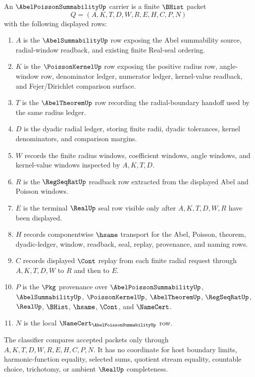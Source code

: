 \begin{definition}
\label{def:abel-poisson-summability-carrier}
An $\AbelPoissonSummabilityUp$ carrier is a finite $\BHist$ packet
$$
Q=(A,K,T,D,W,R,E,H,C,P,N)
$$
with the following displayed rows:
\begin{enumerate}
\item $A$ is the $\AbelSummabilityUp$ row exposing the Abel summability source, radial-window readback, and existing finite Real-seal ordering.
\item $K$ is the $\PoissonKernelUp$ row exposing the positive radius row, angle-window row, denominator ledger, numerator ledger, kernel-value readback, and Fejer/Dirichlet comparison surface.
\item $T$ is the $\AbelTheoremUp$ row recording the radial-boundary handoff used by the same radius ledger.
\item $D$ is the dyadic radial ledger, storing finite radii, dyadic tolerances, kernel denominators, and comparison margins.
\item $W$ records the finite radius windows, coefficient windows, angle windows, and kernel-value windows inspected by $A,K,T,D$.
\item $R$ is the $\RegSeqRatUp$ readback row extracted from the displayed Abel and Poisson windows.
\item $E$ is the terminal $\RealUp$ seal row visible only after $A,K,T,D,W,R$ have been displayed.
\item $H$ records componentwise $\hsame$ transport for the Abel, Poisson, theorem, dyadic-ledger, window, readback, seal, replay, provenance, and naming rows.
\item $C$ records displayed $\Cont$ replay from each finite radial request through $A,K,T,D,W$ to $R$ and then to $E$.
\item $P$ is the $\Pkg$ provenance over $\AbelPoissonSummabilityUp$, $\AbelSummabilityUp$, $\PoissonKernelUp$, $\AbelTheoremUp$, $\RegSeqRatUp$, $\RealUp$, $\BHist$, $\hsame$, $\Cont$, and $\NameCert$.
\item $N$ is the local $\NameCert_{\AbelPoissonSummabilityUp}$ row.
\end{enumerate}
The classifier compares accepted packets only through $A,K,T,D,W,R,E,H,C,P,N$. It has no coordinate for host boundary limits, harmonic-function equality, selected sums, quotient stream equality, countable choice, trichotomy, or ambient $\RealUp$ completeness.
\end{definition}


